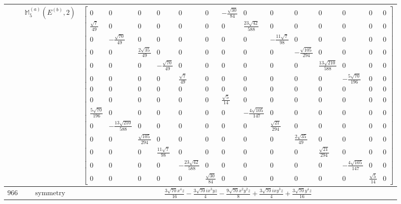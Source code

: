 \documentclass[fleqn,8pt,landscape]{jsarticle}
\begin{document}
\begin{longtable}{ccc}
$  $ & $ \mathbb{M}_{5}^{(a)}(E^{(b)},2) $ & $ \begin{bmatrix} 0 & 0 & 0 & 0 & 0 & 0 & - \frac{\sqrt{30}}{84} & 0 & 0 & 0 & 0 & 0 & 0 & 0 \\ \frac{\sqrt{7}}{49} & 0 & 0 & 0 & 0 & 0 & 0 & \frac{23 \sqrt{42}}{588} & 0 & 0 & 0 & 0 & 0 & 0 \\ 0 & - \frac{\sqrt{70}}{49} & 0 & 0 & 0 & 0 & 0 & 0 & - \frac{11 \sqrt{7}}{98} & 0 & 0 & 0 & 0 & 0 \\ 0 & 0 & \frac{2 \sqrt{35}}{49} & 0 & 0 & 0 & 0 & 0 & 0 & - \frac{\sqrt{105}}{294} & 0 & 0 & 0 & 0 \\ 0 & 0 & 0 & - \frac{\sqrt{70}}{49} & 0 & 0 & 0 & 0 & 0 & 0 & \frac{13 \sqrt{210}}{588} & 0 & 0 & 0 \\ 0 & 0 & 0 & 0 & \frac{\sqrt{7}}{49} & 0 & 0 & 0 & 0 & 0 & 0 & - \frac{5 \sqrt{70}}{196} & 0 & 0 \\ 0 & 0 & 0 & 0 & 0 & 0 & 0 & 0 & 0 & 0 & 0 & 0 & 0 & 0 \\ 0 & 0 & 0 & 0 & 0 & 0 & \frac{\sqrt{5}}{14} & 0 & 0 & 0 & 0 & 0 & 0 & 0 \\ \frac{5 \sqrt{70}}{196} & 0 & 0 & 0 & 0 & 0 & 0 & - \frac{4 \sqrt{105}}{147} & 0 & 0 & 0 & 0 & 0 & 0 \\ 0 & - \frac{13 \sqrt{210}}{588} & 0 & 0 & 0 & 0 & 0 & 0 & \frac{\sqrt{21}}{294} & 0 & 0 & 0 & 0 & 0 \\ 0 & 0 & \frac{\sqrt{105}}{294} & 0 & 0 & 0 & 0 & 0 & 0 & \frac{2 \sqrt{35}}{49} & 0 & 0 & 0 & 0 \\ 0 & 0 & 0 & \frac{11 \sqrt{7}}{98} & 0 & 0 & 0 & 0 & 0 & 0 & \frac{\sqrt{21}}{294} & 0 & 0 & 0 \\ 0 & 0 & 0 & 0 & - \frac{23 \sqrt{42}}{588} & 0 & 0 & 0 & 0 & 0 & 0 & - \frac{4 \sqrt{105}}{147} & 0 & 0 \\ 0 & 0 & 0 & 0 & 0 & \frac{\sqrt{30}}{84} & 0 & 0 & 0 & 0 & 0 & 0 & \frac{\sqrt{5}}{14} & 0 \end{bmatrix} $ \\ \hline
$ 966 $ & $ \text{symmetry} $ & $ \frac{3 \sqrt{70} x^{4} z}{16} - \frac{3 \sqrt{70} i x^{3} y z}{4} - \frac{9 \sqrt{70} x^{2} y^{2} z}{8} + \frac{3 \sqrt{70} i x y^{3} z}{4} + \frac{3 \sqrt{70} y^{4} z}{16} $ \\

\end{longtable}
\end{document}
